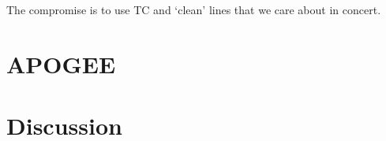 \documentclass[useAMS,usenatbib]{mn2e}
\newcommand\tc{\textit{The Cannon}}
\begin{document}





The compromise is to use TC and `clean' lines that we care about in concert.








\section{APOGEE}





\section{Discussion}
\end{document}
